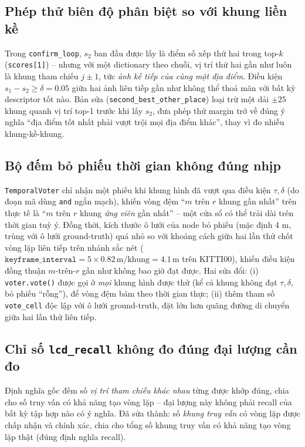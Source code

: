 \documentclass[a4paper,12pt]{article}
\begin{document}
\subsection{Phép thử biên độ phân biệt so với khung liền kề}
Trong \texttt{confirm\_loop}, $s_2$ ban đầu được lấy là điểm số xếp thứ hai trong top-$k$ (\texttt{scores[1]}) -- nhưng với một dictionary theo chuỗi, vị trí thứ hai gần như luôn là khung tham chiếu $j\pm1$, tức \emph{ảnh kế tiếp của cùng một địa điểm}. Điều kiện $s_1-s_2\ge\delta=0.05$ giữa hai ảnh liên tiếp gần như không thể thoả mãn với bất kỳ descriptor tốt nào. Bản sửa (\texttt{second\_best\_other\_place}) loại trừ một dải $\pm 25$ khung quanh vị trí top-1 trước khi lấy $s_2$, đưa phép thử margin trở về đúng ý nghĩa ``địa điểm tốt nhất phải vượt trội mọi địa điểm khác'', thay vì đo nhiễu khung-kề-khung.

\subsection{Bộ đếm bỏ phiếu thời gian không đúng nhịp}
\texttt{TemporalVoter} chỉ nhận một phiếu khi khung hình đã vượt qua điều kiện $\tau,\delta$ (do đoạn mã dùng \texttt{and} ngắn mạch), khiến vòng đệm ``$m$ trên $r$ khung gần nhất'' trên thực tế là ``$m$ trên $r$ khung \emph{ứng viên} gần nhất'' -- một cửa sổ có thể trải dài trên thời gian tuỳ ý. Đồng thời, kích thước ô lưới của node bỏ phiếu (mặc định 4 m, trùng với ô lưới ground-truth) quá nhỏ so với khoảng cách giữa hai lần thử chốt vòng lặp liên tiếp trên nhánh sắc nét ($\texttt{keyframe\_interval}=5 \times 0.82\,\text{m/khung} = 4.1\,\text{m}$ trên KITTI00), khiến điều kiện đồng thuận $m$-trên-$r$ gần như không bao giờ đạt được. Hai sửa đổi: (i) \texttt{voter.vote()} được gọi ở \emph{mọi} khung hình được thử (kể cả khung không đạt $\tau,\delta$, bỏ phiếu ``rỗng''), để vòng đệm bám theo thời gian thực; (ii) thêm tham số \texttt{vote\_cell} độc lập với ô lưới ground-truth, đặt lớn hơn quãng đường di chuyển giữa hai lần thử liên tiếp.

\subsection{Chỉ số \texttt{lcd\_recall} không đo đúng đại lượng cần đo}
Định nghĩa gốc đếm số \emph{vị trí tham chiếu khác nhau} từng được khớp đúng, chia cho số truy vấn có khả năng tạo vòng lặp -- đại lượng này không phải recall của bất kỳ tập hợp nào có ý nghĩa. Đã sửa thành: số \emph{khung truy vấn} có vòng lặp được chấp nhận và chính xác, chia cho tổng số khung truy vấn có khả năng tạo vòng lặp thật (đúng định nghĩa recall).
\end{document}
